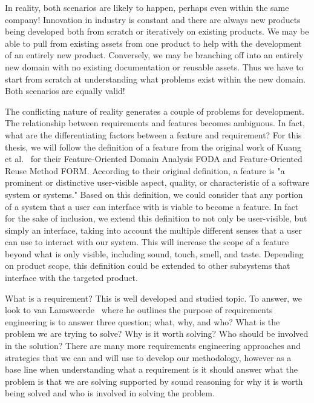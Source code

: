 In reality, both scenarios are likely to happen, perhaps even within the same company! Innovation in industry is constant and there are always new products being developed both from scratch or iteratively on existing products. We may be able to pull from existing assets from one product to help with the development of an entirely new product. Conversely, we may be branching off into an entirely new domain with no existing documentation or reusable assets. Thus we have to start from scratch at understanding what problems exist within the new domain. Both scenarios are equally valid!


The conflicting nature of reality generates a couple of problems for development. The relationship between requirements and features becomes ambiguous. In fact, what are the differentiating factors between a feature and requirement? For this thesis, we will follow the definition of a feature from the original work of Kuang et al.~\cite{kang1990feature, kang1998form} for their Feature-Oriented Domain Analysis \ac{FODA} and Feature-Oriented Reuse Method \ac{FORM}. According to their original definition, a feature is "a prominent or distinctive user-visible aspect, quality, or characteristic of a software system or systems." Based on this definition, we could consider that any portion of a system that a user can interface with is viable to become a feature. In fact for the sake of inclusion, we extend this definition to not only be user-visible, but simply an interface, taking into account the multiple different senses that a user can use to interact with our system. This will increase the scope of a feature beyond what is only visible, including sound, touch, smell, and taste. Depending on product scope, this definition could be extended to other subsystems that interface with the targeted product.

What is a requirement? This is well developed and studied topic. To answer, we look to van Lamsweerde~\cite{lamsweerde2009requirements} where he outlines the purpose of requirements engineering is to answer three question; what, why, and who? What is the problem we are trying to solve? Why is it worth solving? Who should be involved in the solution? There are many more requirements engineering approaches and strategies that we can and will use to develop our methodology, however as a base line when understanding what a requirement is it should answer what the problem is that we are solving supported by sound reasoning for why it is worth being solved and who is involved in solving the problem. 

